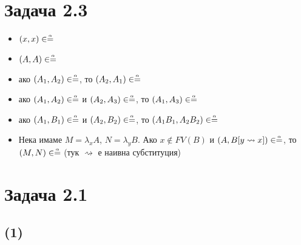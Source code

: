 \documentclass[12pt]{article}
\begin{document}
\newcommand\alphaeq{\mathrel{\stackrel{\makebox[0pt]{\mbox{\normalfont\tiny $\alpha$}}}{=}}}
\newcommand\betaeq{\mathrel{\stackrel{\makebox[0pt]{\mbox{\normalfont\tiny $\beta$}}}{=}}}
\newcommand\betaetaeq{\mathrel{\stackrel{\makebox[0pt]{\mbox{\normalfont\tiny $\beta\eta$}}}{=}}}


\section*{Задача 2.3}
\begin{itemize}
		\item  $(x, x) \in \alphaeq$
		\item $(A, A) \in \alphaeq$
		\item ако $(A_1, A_2) \in \alphaeq$, то $(A_2, A_1) \in \alphaeq$
		\item ако $(A_1, A_2) \in \alphaeq$ и $(A_2, A_3) \in \alphaeq$, то $(A_1, A_3) \in \alphaeq$
		\item ако $(A_1, B_1) \in \alphaeq$ и $(A_2, B_2) \in \alphaeq$, то $(A_1 B_1, A_2 B_2) \in \alphaeq$
		\item Нека имаме $M = \lambda_x A$, $N = \lambda_y B$. Ако $x \notin FV(B)$ и $(A, B[y \rightsquigarrow x]) \in \alphaeq$, то $(M, N) \in \alphaeq$ (тук $\rightsquigarrow$ е наивна субституция)
\end{itemize}

\section*{Задача 2.1}
\subsection*{(1)}
\end{document}
